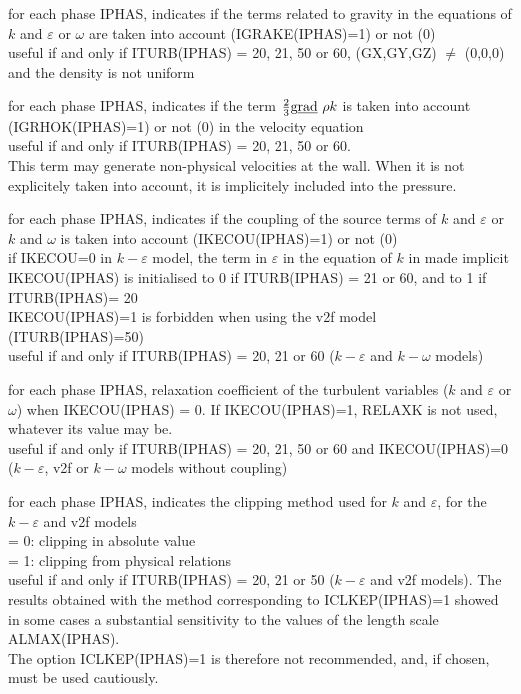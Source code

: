 {for each phase IPHAS, indicates if the terms related to gravity in the
equations of $k$ and $\varepsilon$ or $\omega$ are taken into account
(IGRAKE(IPHAS)=1) or not (0)\\
useful if and only if ITURB(IPHAS) = 20, 21, 50 or 60, (GX,GY,GZ)
$\ne$ (0,0,0) and the density is not uniform}

{for each phase IPHAS, indicates if the term $\frac{2}{3}\text{g}\underline{\text{rad}}\  \rho k$
is taken into account\\ (IGRHOK(IPHAS)=1) or not (0) in the velocity
equation\\
useful if and only if ITURB(IPHAS) = 20, 21, 50 or 60.\\
This term may generate
non-physical velocities at the wall. When it is not explicitely taken into
account, it is implicitely included into the pressure.}

{for each phase IPHAS, indicates if the coupling of the source terms of
$k$ and $\varepsilon$ or $k$ and $\omega$ is taken into account
(IKECOU(IPHAS)=1) or not (0)\\
if IKECOU=0 in $k-\varepsilon$ model, the term in $\varepsilon$ in the
equation of $k$ in made implicit\\
IKECOU(IPHAS) is initialised to 0 if ITURB(IPHAS) = 21 or 60, and to 1 if\\
ITURB(IPHAS)= 20\\
IKECOU(IPHAS)=1 is forbidden when using the v2f model
(ITURB(IPHAS)=50)\\ 
useful if and only if ITURB(IPHAS) = 20, 21 or 60 ($k-\varepsilon$ and
$k-\omega$ models)}

{for each phase IPHAS, relaxation coefficient of the turbulent
variables ($k$ and $\varepsilon$ or $\omega$) when IKECOU(IPHAS) = 0. If
IKECOU(IPHAS)=1, RELAXK is not used, whatever its value may be.\\
useful if and only if ITURB(IPHAS) = 20, 21, 50 or 60 and IKECOU(IPHAS)=0 
($k-\varepsilon$, v2f or $k-\omega$ models without coupling)}

{for each phase IPHAS, indicates the clipping method used for $k$ and
$\varepsilon$, for the $k-\varepsilon$ and v2f models\\
\hspace*{1.3cm}= 0: clipping in absolute value\\
\hspace*{1.3cm}= 1: clipping from physical relations\\
useful if and only if ITURB(IPHAS) = 20, 21 or 50 ($k-\varepsilon$ and
v2f models). The results obtained with the method corresponding to
ICLKEP(IPHAS)=1 showed in some cases a substantial sensitivity to the
values of the length scale ALMAX(IPHAS).\\
The option ICLKEP(IPHAS)=1 is therefore not recommended, and,
if chosen, must be used cautiously.} 


